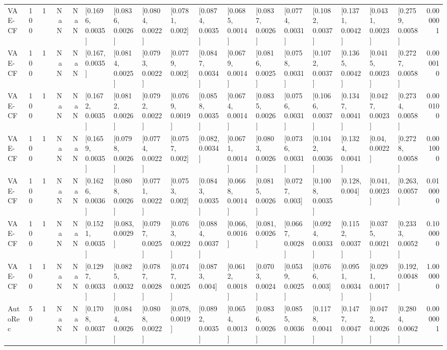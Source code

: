 \begin{tabular}{lllrrllllllllllllr}
  VAE-CF &  100 &     1 &   NaN &   NaN &  [0.1696, 0.0035] &  [0.0836, 0.0026] &  [0.0804, 0.0022] &   [0.0781, 0.002] &  [0.0874, 0.0035] &  [0.0685, 0.0014] &  [0.0837, 0.0026] &  [0.0774, 0.0031] &  [0.1082, 0.0037] &  [0.1371, 0.0042] &  [0.0431, 0.0023] &  [0.2759, 0.0058] &  0.000001 \\
  VAE-CF &  100 &     1 &   NaN &   NaN &   [0.167, 0.0035] &  [0.0814, 0.0025] &  [0.0793, 0.0022] &   [0.0779, 0.002] &  [0.0847, 0.0034] &  [0.0679, 0.0014] &  [0.0816, 0.0025] &  [0.0758, 0.0031] &  [0.1072, 0.0037] &  [0.1365, 0.0042] &  [0.0415, 0.0023] &  [0.2727, 0.0058] &  0.000010 \\
  VAE-CF &  100 &     1 &   NaN &   NaN &  [0.1672, 0.0035] &  [0.0812, 0.0026] &  [0.0792, 0.0022] &  [0.0769, 0.0019] &  [0.0858, 0.0035] &  [0.0674, 0.0014] &  [0.0835, 0.0026] &  [0.0756, 0.0031] &  [0.1066, 0.0037] &  [0.1347, 0.0041] &  [0.0427, 0.0023] &  [0.2734, 0.0058] &  0.000100 \\
  VAE-CF &  100 &     1 &   NaN &   NaN &  [0.1659, 0.0035] &  [0.0798, 0.0026] &  [0.0774, 0.0022] &   [0.0757, 0.002] &   [0.082, 0.0034] &  [0.0671, 0.0014] &  [0.0803, 0.0026] &  [0.0736, 0.0031] &  [0.1042, 0.0036] &  [0.1324, 0.0041] &    [0.04, 0.0022] &  [0.2728, 0.0058] &  0.001000 \\
  VAE-CF &  100 &     1 &   NaN &   NaN &  [0.1626, 0.0036] &  [0.0808, 0.0026] &  [0.0771, 0.0022] &   [0.0753, 0.002] &  [0.0843, 0.0035] &  [0.0668, 0.0014] &  [0.0815, 0.0026] &   [0.0727, 0.003] &  [0.1008, 0.0035] &    [0.128, 0.004] &   [0.041, 0.0023] &   [0.263, 0.0057] &  0.010000 \\
  VAE-CF &  100 &     1 &   NaN &   NaN &  [0.1521, 0.0035] &   [0.083, 0.0029] &  [0.0797, 0.0025] &  [0.0763, 0.0022] &  [0.0884, 0.0037] &   [0.066, 0.0016] &   [0.081, 0.0026] &  [0.0667, 0.0028] &  [0.0924, 0.0033] &  [0.1152, 0.0037] &  [0.0375, 0.0021] &  [0.2333, 0.0052] &  0.100000 \\
  VAE-CF &  100 &     1 &   NaN &   NaN &  [0.1297, 0.0033] &  [0.0825, 0.0032] &  [0.0787, 0.0028] &  [0.0747, 0.0025] &   [0.0873, 0.004] &  [0.0612, 0.0018] &  [0.0703, 0.0024] &  [0.0539, 0.0025] &   [0.0766, 0.003] &  [0.0951, 0.0034] &  [0.0291, 0.0017] &   [0.192, 0.0048] &  1.000000 \\
 AutoRec &   50 &     1 &   NaN &   NaN &  [0.1708, 0.0037] &  [0.0844, 0.0026] &  [0.0808, 0.0022] &   [0.078, 0.0019] &  [0.0892, 0.0035] &  [0.0654, 0.0013] &  [0.0836, 0.0026] &  [0.0855, 0.0036] &  [0.1178, 0.0041] &  [0.1477, 0.0047] &  [0.0472, 0.0026] &  [0.2804, 0.0062] &  0.000001 \\

\end{tabular}
